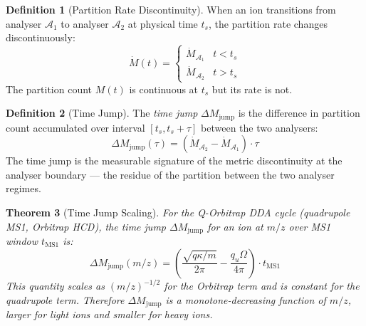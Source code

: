 \documentclass[11pt,twocolumn,a4paper]{article}
\theoremstyle{plain}
\newtheorem{theorem}{Theorem}[section]
\theoremstyle{definition}
\newtheorem{definition}[theorem]{Definition}
\theoremstyle{remark}
\begin{document}
\begin{definition}[Partition Rate Discontinuity]
\label{def:rate_discontinuity}
When an ion transitions from analyser $\mathcal{A}_1$ to analyser $\mathcal{A}_2$
at physical time $t_s$, the partition rate changes discontinuously:
\begin{equation}
    \dot{M}(t) = \begin{cases}
        \dot{M}_{\mathcal{A}_1} & t < t_s \\
        \dot{M}_{\mathcal{A}_2} & t > t_s
    \end{cases}
    \label{eq:rate_discontinuity}
\end{equation}
The partition count $M(t)$ is continuous at $t_s$ but its rate is not.
\end{definition}

\begin{definition}[Time Jump]
\label{def:time_jump}
The \emph{time jump} $\Delta M_{\mathrm{jump}}$ is the difference in partition
count accumulated over interval $[t_s, t_s + \tau]$ between the two analysers:
\begin{equation}
    \Delta M_{\mathrm{jump}}(\tau) = \left(\dot{M}_{\mathcal{A}_2} -
    \dot{M}_{\mathcal{A}_1}\right) \cdot \tau
    \label{eq:time_jump}
\end{equation}
The time jump is the measurable signature of the metric discontinuity at the
analyser boundary --- the residue of the partition between the two analyser
regimes.
\end{definition}

\begin{theorem}[Time Jump Scaling]
\label{thm:jump_scaling}
For the Q-Orbitrap DDA cycle (quadrupole MS1, Orbitrap HCD), the time jump
$\Delta M_{\mathrm{jump}}$ for an ion at $m/z$ over MS1 window $t_{\mathrm{MS1}}$
is:
\begin{equation}
    \Delta M_{\mathrm{jump}}(m/z) = \left(\frac{\sqrt{q\kappa/m}}{2\pi} -
    \frac{q_u\Omega}{4\pi}\right) \cdot t_{\mathrm{MS1}}
    \label{eq:jump_scaling}
\end{equation}
This quantity scales as $(m/z)^{-1/2}$ for the Orbitrap term and is constant
for the quadrupole term. Therefore $\Delta M_{\mathrm{jump}}$ is a
monotone-decreasing function of $m/z$, larger for light ions and smaller for
heavy ions.
\end{theorem}
\end{document}
